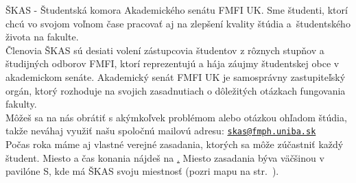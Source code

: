 ŠKAS - Študentská komora Akademického senátu FMFI UK. Sme študenti, ktorí chcú vo svojom voľnom čase pracovať aj na zlepšení kvality štúdia a~študentského života na fakulte. \\

Členovia ŠKAS sú desiati volení zástupcovia študentov z rôznych stupňov a študijných odborov FMFI, ktorí reprezentujú a hája záujmy študentskej obce v akademickom senáte. Akademický senát FMFI UK je samosprávny zastupiteľský orgán,
ktorý rozhoduje na svojich zasadnutiach o dôležitých otázkach fungovania fakulty. \\

Môžeš sa na nás obrátiť s akýmkoľvek problémom alebo otázkou ohľadom štúdia, takže neváhaj využiť našu spoločnú mailovú adresu: \href{mailto:skas@fmph.uniba.sk}{\texttt{skas@fmph.uniba.sk}} \\

Počas roka máme aj vlastné verejné zasadania, ktorých sa môže zúčastniť každý študent. Miesto a čas konania nájdeš na \href{https://zona.fmph.uniba.sk/skas/%7D%7BŠKAS stránke}. Miesto zasadania býva väčšinou v pavilóne S, kde má ŠKAS svoju miestnosť (pozri mapu na str.\ \pageref{fig:mapa_fmfi}). \\




